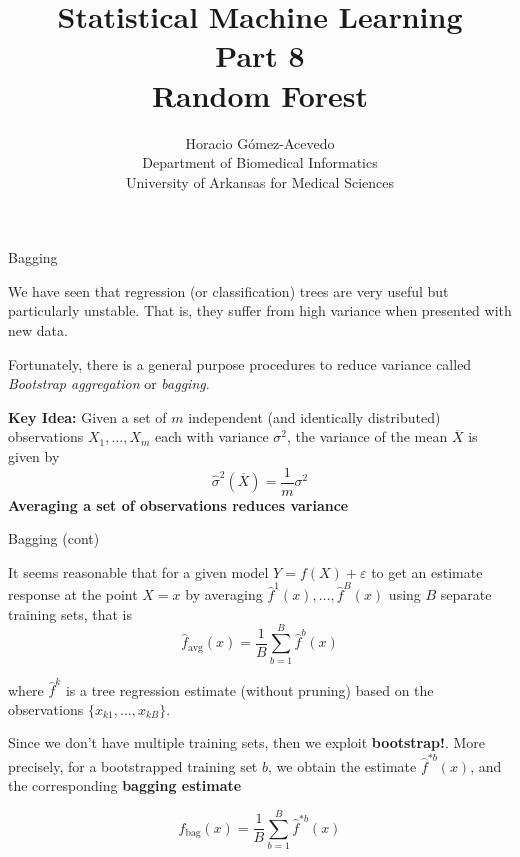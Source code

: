\documentclass{beamer}
\title{Statistical Machine Learning\\ Part 8\\ Random Forest}
\author{Horacio G\'omez-Acevedo\\ Department of Biomedical Informatics\\
University of Arkansas for Medical Sciences}
\begin{document}
	\begin{frame}[plain]
		\maketitle
	\end{frame}
	\begin{frame}{Bagging}
		
		We have seen that regression (or classification) trees are very useful but particularly unstable. That is, they suffer from high variance when presented with new data. 
		
		Fortunately, there is a general purpose procedures to reduce variance called {\it Bootstrap aggregation} or {\it bagging}. 
		
		{\bf Key Idea:} Given a set of $m$ independent (and identically distributed)  observations $X_1,\ldots, X_m$ each with variance $\sigma^2$, the variance of the mean $\overline{X}$ is given by 
		\begin{equation*}
			\hat{\sigma}^2(\overline{X})= \frac{1}{m} \sigma^2
		\end{equation*}
		{\bf Averaging a set of observations reduces variance}
		
	\end{frame}

\begin{frame}{Bagging (cont)}
	
	It seems reasonable that for a given model $Y=f(X)+\varepsilon$ to get an estimate response at the point $X=x$ by averaging $\hat{f}^1(x), \ldots, \hat{f}^B(x)$ using $B$ separate training sets, that is 
	\begin{equation*}
		\hat{f}_{\textrm{avg}}(x)= \frac{1}{B} \sum_{b=1}^B \hat{f}^b (x)
	\end{equation*}

where $\hat{f}^k$ is a tree regression estimate (without pruning) based on the observations $\{x_{k1},\ldots,x_{kB}\}$.

Since we don't have multiple training sets, then we exploit {\bf bootstrap!}.  More precisely, for a bootstrapped training set $b$, we obtain the estimate $\hat{f}^{*b}(x)$, and the corresponding {\bf bagging estimate}

	\begin{equation*}
	\hat{f}_{\textrm{bag}}(x)= \frac{1}{B} \sum_{b=1}^B \hat{f}^{*b} (x)
\end{equation*}

\end{frame}
	
\end{document}

